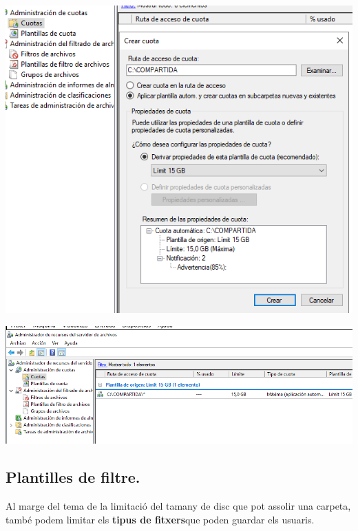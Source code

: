 \documentclass[
  a4paper,
]{article}
\begin{document}
\includegraphics{png/Cuota7.png}

\includegraphics{png/Cuota9.png}

\subsection{Plantilles de filtre.}\label{plantilles-de-filtre.}

Al marge del tema de la limitació del tamany de disc que pot assolir una
carpeta, també podem limitar els \textbf{tipus de fitxers}que poden
guardar els usuaris.
\end{document}
